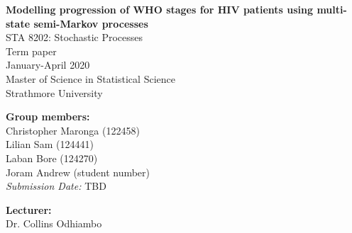 \documentclass[11pt]{article}
\begin{document}
\clearpage\thispagestyle{empty}

\begin{center}
	\textbf{\huge{
	Modelling progression of WHO stages for HIV patients using multi-state semi-Markov processes
	}} \\[1.5cm]
	\Large{
	STA 8202: Stochastic Processes \\
	Term paper \\
	January-April 2020\\[0.5cm]
	Master of Science in Statistical Science\\
	Strathmore University	
	}
\end{center}

\vspace*{1cm}
\textbf{\large{Group members:}}\\
Christopher Maronga (122458) \\
Lilian Sam (124441) \\
Laban Bore (124270) \\
Joram Andrew (student number) \\[0.5cm]

\noindent\textit{Submission Date:} TBD

\vspace*{2.5cm}
\textbf{\large{Lecturer:}}\\
Dr. Collins Odhiambo 


\newpage \setcounter{page}{1}
\end{document}
